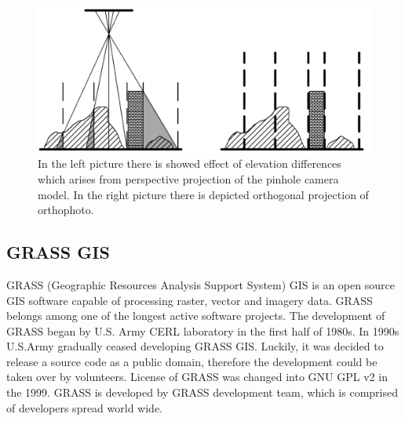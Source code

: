 \documentclass[a4paper,12pt]{article}
\begin{document}

\begin{figure}[h]
    \centering
    \includegraphics[scale=0.2]{figures/orthophoto.png}
    \caption{In the left picture there is showed effect of elevation differences 
    which arises from perspective projection of the pinhole camera model. 
    In the right picture there is depicted orthogonal projection of orthophoto.}
    \label{fig:ortho}
\end{figure}


\subsection{GRASS GIS}
\label{sec:GRASS_intro}

GRASS (Geographic Resources Analysis Support System) GIS is an open source GIS software capable of processing raster, vector and imagery data. 
GRASS belongs among one of 
the longest active software projects. The development of GRASS began by U.S. Army CERL  laboratory
in the first half of 1980s. In 1990s U.S.Army gradually ceased developing GRASS GIS. Luckily, it was decided to 
release a source code as a public domain, therefore the development could be taken over by volunteers.  License 
of GRASS was changed into GNU GPL v2 in the 1999. GRASS is developed by GRASS development 
team, which is comprised of developers spread world wide. 


\end{document}
